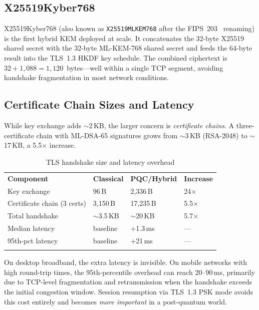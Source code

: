 \subsection{X25519Kyber768}
\label{subsec:x25519kyber768}

X25519Kyber768 (also known as \texttt{X25519MLKEM768} after the FIPS~203~\cite{FIPS203} renaming) is the first hybrid KEM deployed at scale.  It concatenates the 32-byte X25519 shared secret with the 32-byte ML-KEM-768 shared secret and feeds the 64-byte result into the TLS~1.3 HKDF key schedule.  The combined ciphertext is $32 + 1{,}088 = 1{,}120$~bytes---well within a single TCP segment, avoiding handshake fragmentation in most network conditions.


\subsection{Certificate Chain Sizes and Latency}
\label{subsec:cert-chain-sizes}

While key exchange adds $\sim$2\,KB, the larger concern is \emph{certificate chains}.  A three-certificate chain with ML-DSA-65 signatures grows from $\sim$3\,KB (RSA-2048) to $\sim$17\,KB, a 5.5$\times$ increase.

\begin{table}[t]
\caption{TLS handshake size and latency overhead}
\label{tab:tls-overhead}
\begin{tabular}{p{4cm}p{2.5cm}p{2.5cm}p{2.5cm}}
\hline\noalign{\smallskip}
\textbf{Component} & \textbf{Classical} & \textbf{PQC/Hybrid} & \textbf{Increase} \\
\noalign{\smallskip}\svhline\noalign{\smallskip}
Key exchange & 96\,B & 2{,}336\,B & 24$\times$ \\
Certificate chain (3 certs) & 3{,}150\,B & 17{,}235\,B & 5.5$\times$ \\
Total handshake & $\sim$3.5\,KB & $\sim$20\,KB & 5.7$\times$ \\
Median latency & baseline & +1.3\,ms & --- \\
95th-pct latency & baseline & +21\,ms & --- \\
\noalign{\smallskip}\hline
\end{tabular}
\end{table}

On desktop broadband, the extra latency is invisible.  On mobile networks with high round-trip times, the 95th-percentile overhead can reach 20--90\,ms, primarily due to TCP-level fragmentation and retransmission when the handshake exceeds the initial congestion window.  Session resumption via TLS~1.3 PSK mode avoids this cost entirely and becomes \emph{more important} in a post-quantum world.

